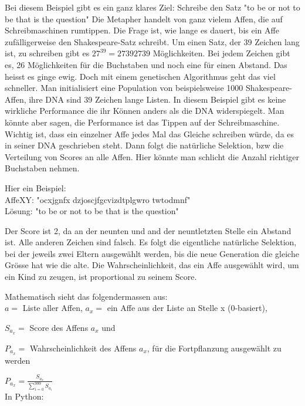 \documentclass[10pt,a4paper,ngerman,english]{article}
\begin{document}
Bei diesem Beispiel gibt es ein ganz klares Ziel: Schreibe den Satz "to be or not to be that is the question" Die Metapher handelt von ganz vielem Affen, die auf Schreibmaschinen rumtippen. Die Frage ist, wie lange es dauert, bis ein Affe zufälligerweise den Shakespeare-Satz schreibt. Um einen Satz, der 39 Zeichen lang ist, zu schreiben gibt es $ 27^{39} = 27392739 $ Möglichkeiten. Bei jedem Zeichen gibt es, 26 Möglichkeiten für die Buchstaben und noch eine für einen Abstand. Das heisst es ginge ewig. Doch mit einem genetischen Algorithmus geht das viel schneller. Man initialisiert eine Population von beispielsweise 1000 Shakespeare-Affen, ihre DNA sind 39 Zeichen lange Listen. In diesem Beispiel gibt es keine wirkliche Performance die ihr Können anders als die DNA widerspiegelt. Man könnte aber sagen, die Performance ist das Tippen auf der Schreibmaschine. Wichtig ist, dass ein einzelner Affe jedes Mal das Gleiche schreiben würde, da es in seiner DNA geschrieben steht. Dann folgt die natürliche Selektion, bzw die Verteilung von Scores an alle Affen. Hier könnte man schlicht die Anzahl richtiger Buchstaben nehmen.

\bigskip
Hier ein Beispiel:\\
AffeXY: "ocxjgnfx dzjoscjfgcvizdtplgwro twtodmnf"\\
Lösung: "to be or not to be that is the question"

Der Score ist 2, da an der neunten und and der neuntletzten Stelle ein Abstand ist. Alle anderen Zeichen sind falsch. Es folgt die eigentliche natürliche Selektion, bei der jeweils zwei Eltern ausgewählt werden, bis die neue Generation die gleiche Grösse hat wie die alte. Die Wahrscheinlichkeit, das ein Affe ausgewählt wird, um ein Kind zu zeugen, ist proportional zu seinem Score. 

Mathematisch sieht das folgendermassen aus:\\

$ a = $ Liste aller Affen, $ a_x = $ ein Affe aus der Liste an Stelle x (0-basiert),

$ S_{a_x} = $ Score des Affens $ a_x $ und 

$ P_{a_x} = $ Wahrscheinlichkeit des Affens $ a_x $, für die Fortpflanzung ausgewählt zu werden

$ P_{a_x} = \frac{S_{a_x}}{\sum_{i=0}^{999} S_{a_i}} $\\

In Python:

\end{document}
